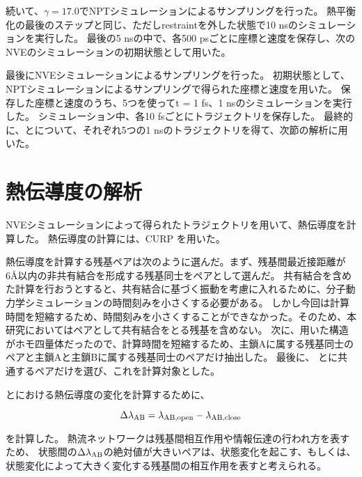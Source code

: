 続いて、$\gamma = 17.0$でNP\gamma Tシミュレーションによるサンプリングを行った。
熱平衡化の最後のステップと同じ、ただしrestraintを外した状態で10 nsのシミュレーションを実行した。
最後の5 nsの中で、各500 psごとに座標と速度を保存し、次のNVEのシミュレーションの初期状態として用いた。

最後にNVEシミュレーションによるサンプリングを行った。
初期状態として、NP\gamma Tシミュレーションによるサンプリングで得られた座標と速度を用いた。
保存した座標と速度のうち、5つを使って\Delta t = 1 fs、1 nsのシミュレーションを実行した。
シミュレーション中、各10 fsごとにトラジェクトリを保存した。
最終的に、\openFortyTwo と\closeFortyTwo について、それぞれ5つの1 nsのトラジェクトリを得て、次節の解析に用いた。

\section{熱伝導度の解析}

NVEシミュレーションによって得られたトラジェクトリを用いて、熱伝導度を計算した。
熱伝導度の計算には、CURP\autocite{ishikura_energy_2015,ota_energy_2019,yamatoComputationalStudyThermal2022,wangSiteselectiveHeatCurrent2023} を用いた。

熱伝導度を計算する残基ペアは次のように選んだ。まず、残基間最近接距離が6\AA 以内の非共有結合を形成する残基同士をペアとして選んだ。
共有結合を含めた計算を行おうとすると、共有結合に基づく振動を考慮に入れるために、分子動力学シミュレーションの時間刻みを小さくする必要がある。
しかし今回は計算時間を短縮するため、時間刻みを小さくすることができなかった。そのため、本研究においてはペアとして共有結合をとる残基を含めない。
次に、用いた構造がホモ四量体だったので、計算時間を短縮するため、主鎖Aに属する残基同士のペアと主鎖Aと主鎖Bに属する残基同士のペアだけ抽出した。
最後に、 \openFortyTwo と\closeFortyTwo に共通するペアだけを選び、これを計算対象とした。

\openFortyTwo と\closeFortyTwo における熱伝導度の変化を計算するために、

\begin{equation}
  \label{eq:thermal_conductivity_difference}
  \Delta \lambda_{\rm{AB}} = \lambda_{\rm{AB, open}} - \lambda_{\rm{AB, close}}
\end{equation}

を計算した。
熱流ネットワークは残基間相互作用や情報伝達の行われ方を表すため、
状態間の$\Delta \lambda_{\rm{AB}}$の絶対値が大きいペアは、状態変化を起こす、もしくは、状態変化によって大きく変化する残基間の相互作用を表すと考えられる。

